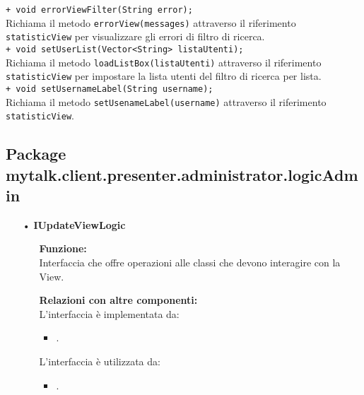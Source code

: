 {\begin{sloppypar}
{\begin{itemize}
\begin{itemize}
					\texttt{+ void errorViewFilter(String error);}\\
					Richiama il metodo \texttt{errorView(messages)} attraverso il riferimento \texttt{statisticView} per visualizzare gli errori di filtro di ricerca.\\
					
					\texttt{+ void setUserList(Vector<String> listaUtenti);}\\
					Richiama il metodo \texttt{loadListBox(listaUtenti)} attraverso il riferimento \texttt{statisticView} per impostare la lista utenti del filtro di ricerca per lista.\\
					
					\texttt{+ void setUsernameLabel(String username);}\\
					Richiama il metodo \texttt{setUsenameLabel(username)} attraverso il riferimento \texttt{statisticView}.\\
			\end{itemize}

	\end{itemize}
		
	}

	\subsection{Package mytalk.client.presenter.administrator.logicAdmin} {
		\begin{itemize}
		
		\item[•] \textbf{IUpdateViewLogic}
			\begin{itemize}
				\item[]  \textbf{Funzione:} \\
				Interfaccia che offre operazioni alle classi che devono interagire con la View.
				
				\item[]  \textbf{Relazioni con altre componenti:} \\
				L'interfaccia è implementata da:
				\begin{itemize}
					\item {}.
				\end{itemize}
				L’interfaccia è utilizzata da:
				\begin{itemize}
					\item {}.
				\end{itemize}
				

\end{itemize}
\end{itemize}}
\end{sloppypar}}
